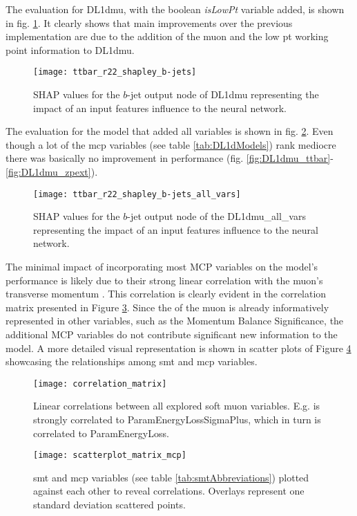 The evaluation for DL1dmu, with the boolean \textit{isLowPt} variable added, is shown in fig. \ref{fig:shapleyDL1dmu}. It clearly shows that main improvements over the previous implementation are due to the addition of the muon \pt and the low pt working point information to DL1dmu.
\begin{figure}[]
  \centering
  \texttt{[image: ttbar\_r22\_shapley\_b-jets]}
  \caption{SHAP values for the $b$-jet output node of DL1dmu representing the impact of an input features influence to the neural network.}
  \label{fig:shapleyDL1dmu}
\end{figure}
The evaluation for the model that added all variables is shown in fig. \ref{fig:ttbar_r22_shapley_b_all_vars}. Even though a lot of the \ac{mcp} variables (see table \ref{tab:DL1dModels}) rank mediocre there was basically no improvement in performance (fig. \ref{fig:DL1dmu_ttbar}-\ref{fig:DL1dmu_zpext}).
\begin{figure}[]
  \centering
  \texttt{[image: ttbar\_r22\_shapley\_b-jets\_all\_vars]}
  \caption{SHAP values for the $b$-jet output node of the DL1dmu\_all\_vars representing the impact of an input features influence to the neural network.}
  \label{fig:ttbar_r22_shapley_b_all_vars}
\end{figure}
The minimal impact of incorporating most MCP variables on the model's performance is likely due to their strong linear correlation with the muon's transverse momentum \pt. This correlation is clearly evident in the correlation matrix presented in Figure \ref{fig:correlation_matrix}. Since the \pt of the muon is already informatively represented in other variables, such as the Momentum Balance Significance, the additional MCP variables do not contribute significant new information to the model. A more detailed visual representation is shown in scatter plots of Figure \ref{fig:scatterplot_matrix_mcp} showcasing the relationships among \ac{smt} and \ac{mcp} variables.
\begin{figure}[]
  \centering
  \texttt{[image: correlation\_matrix]}
  \caption{Linear correlations between all explored soft muon variables. E.g. \pt is strongly correlated to ParamEnergyLossSigmaPlus, which in turn is  correlated to ParamEnergyLoss. }
  \label{fig:correlation_matrix}
\end{figure}

\begin{figure}[]
  \centering
  \texttt{[image: scatterplot\_matrix\_mcp]}
  \caption{\ac{smt} and \ac{mcp} variables (see table \ref{tab:smtAbbreviations}) plotted against each other to reveal correlations. Overlays represent one standard deviation scattered points.}
  \label{fig:scatterplot_matrix_mcp}
\end{figure}


